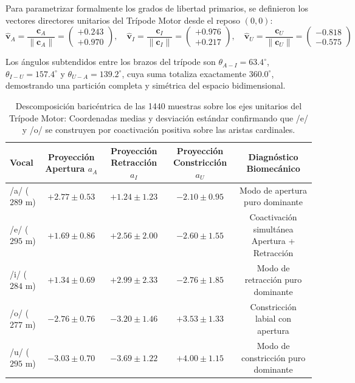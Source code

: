 \documentclass[11pt,a4paper]{article}
\begin{document}
Para parametrizar formalmente los grados de libertad primarios, se definieron los vectores directores unitarios del Trípode Motor desde el reposo $(0, 0)$:
\begin{equation}
    \hat{\mathbf{v}}_A = \frac{\mathbf{c}_A}{\|\mathbf{c}_A\|} = \begin{pmatrix} +0.243 \\ +0.970 \end{pmatrix}, \quad 
    \hat{\mathbf{v}}_I = \frac{\mathbf{c}_I}{\|\mathbf{c}_I\|} = \begin{pmatrix} +0.976 \\ +0.217 \end{pmatrix}, \quad 
    \hat{\mathbf{v}}_U = \frac{\mathbf{c}_U}{\|\mathbf{c}_U\|} = \begin{pmatrix} -0.818 \\ -0.575 \end{pmatrix}
\end{equation}

Los ángulos subtendidos entre los brazos del trípode son $\theta_{A-I} = 63.4^\circ$, $\theta_{I-U} = 157.4^\circ$ y $\theta_{U-A} = 139.2^\circ$, cuya suma totaliza exactamente $360.0^\circ$, demostrando una partición completa y simétrica del espacio bidimensional.

\begin{table}[H]
\centering
\small
\begin{tabular}{lcccc}
\toprule
\textbf{Vocal} & \textbf{Proyección Apertura $a_A$} & \textbf{Proyección Retracción $a_I$} & \textbf{Proyección Constricción $a_U$} & \textbf{Diagnóstico Biomecánico} \\
\midrule
/a/ ($289$ m) & $\mathbf{+2.77 \pm 0.53}$ & $+1.24 \pm 1.23$          & $-2.10 \pm 0.95$ & Modo de apertura puro dominante \\
/e/ ($295$ m) & $\mathbf{+1.69 \pm 0.86}$ & $\mathbf{+2.56 \pm 2.00}$ & $-2.60 \pm 1.55$ & Coactivación simultánea Apertura + Retracción \\
/i/ ($284$ m) & $+1.34 \pm 0.69$          & $\mathbf{+2.99 \pm 2.33}$ & $-2.76 \pm 1.85$ & Modo de retracción puro dominante \\
/o/ ($277$ m) & $-2.76 \pm 0.76$          & $-3.20 \pm 1.46$          & $\mathbf{+3.53 \pm 1.33}$ & Constricción labial con apertura \\
/u/ ($295$ m) & $-3.03 \pm 0.70$          & $-3.69 \pm 1.22$          & $\mathbf{+4.00 \pm 1.15}$ & Modo de constricción puro dominante \\
\bottomrule
\end{tabular}
\caption{Descomposición baricéntrica de las 1440 muestras sobre los ejes unitarios del Trípode Motor: Coordenadas medias y desviación estándar confirmando que /e/ y /o/ se construyen por coactivación positiva sobre las aristas cardinales.}
\label{tab:coordenadas_tripode_motor}
\end{table}
\end{document}
